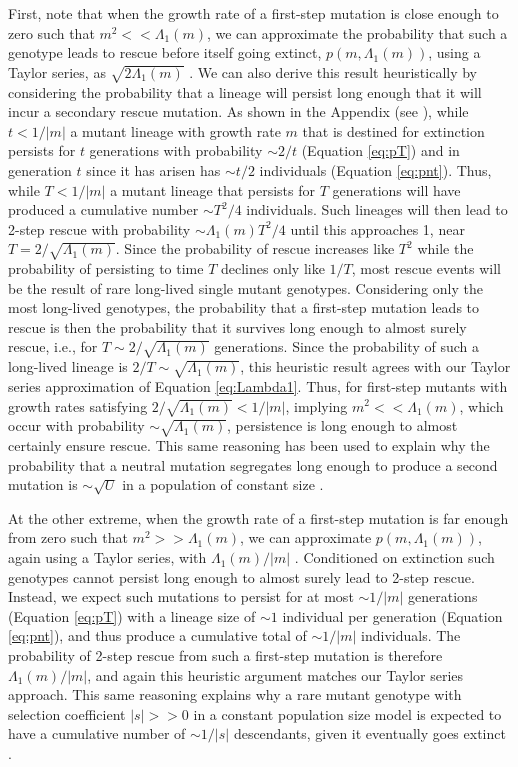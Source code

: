 \documentclass[9pt,twocolumn,twoside,lineno]{gsajnl}
\begin{document}
First, note that when the growth rate of a first-step mutation is close enough to zero such that $m^2 << \Lambda_1(m)$, we can approximate the probability that such a genotype leads to rescue before itself going extinct, $p(m,\Lambda_1(m))$, using a Taylor series, as $\sqrt{2\Lambda_1(m)}$ \citep[c.f.\ equation A.4b in][see also File S1]{Iwasa2004}.
We can also derive this result heuristically by considering the probability that a lineage will persist long enough that it will incur a secondary rescue mutation.
As shown in the Appendix (see ), while $t<1/|m|$ a mutant lineage with growth rate $m$ that is destined for extinction persists for $t$ generations with probability $\sim2/t$ (Equation \ref{eq:pT}) and in generation $t$ since it has arisen has $\sim t/2$ individuals (Equation \ref{eq:pnt}). 
Thus, while $T<1/|m|$ a mutant lineage that persists for $T$ generations will have produced a cumulative number $\sim T^2/4$ individuals. 
Such lineages will then lead to 2-step rescue with probability $\sim \Lambda_1(m) T^2/4$ until this approaches 1, near $T=2/\sqrt{\Lambda_1(m)}$.
Since the probability of rescue increases like $T^2$ while the probability of persisting to time $T$ declines only like $1/T$, most rescue events will be the result of rare long-lived single mutant genotypes.
Considering only the most long-lived genotypes, the probability that a first-step mutation leads to rescue is then the probability that it survives long enough to almost surely rescue, i.e., for $T\sim2/\sqrt{\Lambda_1(m)}$ generations.
Since the probability of such a long-lived lineage is $2/T \sim \sqrt{\Lambda_1(m)}$, this heuristic result agrees with our Taylor series approximation of Equation \ref{eq:Lambda1}.
Thus, for first-step mutants with growth rates satisfying $2/\sqrt{\Lambda_1(m)} < 1/|m|$, implying $m^2 << \Lambda_1(m)$, which occur with probability $\sim \sqrt{\Lambda_1(m)}$, persistence is long enough to almost certainly ensure rescue.
This same reasoning has been used to explain why the probability that a neutral mutation segregates long enough to produce a second mutation is $\sim\sqrt{U}$ in a population of constant size \citep{Weissman2009}.

At the other extreme, when the growth rate of a first-step mutation is far enough from zero such that $m^2 >> \Lambda_1(m)$, we can approximate $p(m,\Lambda_1(m))$, again using a Taylor series, with $\Lambda_1(m)/ |m|$ \citep[c.f.\ equation A.4c in][see also File S1]{Iwasa2004}.
Conditioned on extinction such genotypes cannot persist long enough to almost surely lead to 2-step rescue.
Instead, we expect such mutations to persist for at most $\sim1/|m|$ generations (Equation \ref{eq:pT}) with a lineage size of $\sim1$ individual per generation (Equation \ref{eq:pnt}), and thus produce a cumulative total of $\sim 1/|m|$ individuals. 
The probability of 2-step rescue from such a first-step mutation is therefore $\Lambda_1(m)/ |m|$, and again this heuristic argument matches our Taylor series approach.
This same reasoning explains why a rare mutant genotype with selection coefficient $|s|>>0$ in a constant population size model is expected to have a cumulative number of $\sim1/|s|$ descendants, given it eventually goes extinct \citep{Weissman2009}. 
\end{document}
